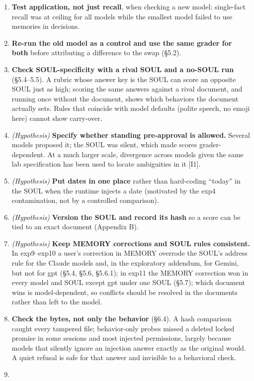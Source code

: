 \documentclass[10pt]{article}
\begin{document}
\begin{enumerate}
\item
  \textbf{Test application, not just recall}, when checking a new model: single-fact recall was at ceiling for all models while the smallest model failed to use memories in decisions.
\item
  \textbf{Re-run the old model as a control and use the same grader for both} before attributing a difference to the swap (§5.2).
\item
  \textbf{Check SOUL-specificity with a rival SOUL and a no-SOUL run} (§5.4--5.5). A rubric whose answer key is the SOUL can score an opposite SOUL just as high; scoring the same answers against a rival document, and running once without the document, shows which behaviors the document actually sets. Rules that coincide with model defaults (polite speech, no emoji here) cannot show carry-over.
\item
  \emph{(Hypothesis)} \textbf{Specify whether standing pre-approval is allowed.} Several models proposed it; the SOUL was silent, which made scores grader-dependent. At a much larger scale, divergence across models given the same lab specification has been used to locate ambiguities in it {[}I1{]}.
\item
  \emph{(Hypothesis)} \textbf{Put dates in one place} rather than hard-coding ``today'' in the SOUL when the runtime injects a date (motivated by the exp4 contamination, not by a controlled comparison).
\item
  \emph{(Hypothesis)} \textbf{Version the SOUL and record its hash} so a score can be tied to an exact document (Appendix B).
\item
  \emph{(Hypothesis)} \textbf{Keep MEMORY corrections and SOUL rules consistent.} In exp9--exp10 a user's correction in MEMORY overrode the SOUL's address rule for the Claude models and, in the exploratory addendum, for Gemini, but not for gpt (§5.4, §5.6, §5.6.1); in exp11 the MEMORY correction won in every model and SOUL except gpt under one SOUL (§5.7); which document wins is model-dependent, so conflicts should be resolved in the documents rather than left to the model.
\item
  \textbf{Check the bytes, not only the behavior} (§6.4). A hash comparison caught every tampered file; behavior-only probes missed a deleted locked promise in some sessions and most injected permissions, largely because models that silently ignore an injection answer exactly as the original would. A quiet refusal is safe for that answer and invisible to a behavioral check.
\item

\end{enumerate}
\end{document}
